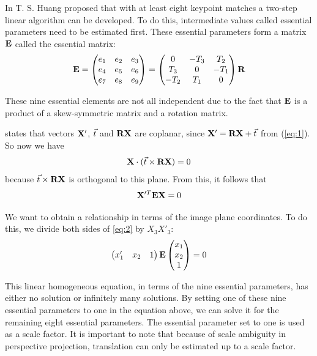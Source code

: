 In \cite{improc} T. S. Huang proposed that with at least eight keypoint matches a two-step linear algorithm can be developed. To do this, intermediate values called essential parameters need to be estimated first. These essential parameters form a matrix $\mathbf{E}$ called the essential matrix:
\begin{equation}\label{eq:essential_def}
    \mathbf{E} = 
    \begin{pmatrix}
        e_1&e_2&e_3 \\
        e_4&e_5&e_6 \\
        e_7&e_8&e_9 
    \end{pmatrix}
    = \begin{pmatrix}
        0&-T_3&T_2 \\
        T_3&0&-T_1 \\
        -T_2&T_1&0
    \end{pmatrix}
     \mathbf{R}
\end{equation}

These nine essential elements are not all independent due to the fact that  $\mathbf{E}$ is a product of a skew-symmetric matrix and a rotation matrix.\bigskip

\cite{tekalp} states that vectors $\mathbf{X}'$, $\vec t$ and $\mathbf{R}\mathbf{X}$ are coplanar, since $\mathbf{X}' = \mathbf{R}\mathbf{X} + \vec t$ from (\ref{eq:1}). So now we have 
\begin{equation}
    \mathbf{X} \cdot (\vec t \times \mathbf{R}\mathbf{X}) = 0
\end{equation}
because $\vec t \times \mathbf{R}\mathbf{X}$ is orthogonal to this plane. From this, it follows that 
\begin{equation} \label{eq:2}
    \mathbf{X}'^T\mathbf{E}\mathbf{X} = 0
\end{equation}

We want to obtain a relationship in terms of the image plane coordinates. To do this, we divide both sides of \ref{eq:2} by $X_3 X'_3$:
\begin{equation} \label{eq:essential}
    \begin{pmatrix}
        x_1'&x_2&1
    \end{pmatrix}
    \mathbf{E}
    \begin{pmatrix}
        x_1 \\
        x_2 \\
        1
    \end{pmatrix}
    = 0
\end{equation}

This linear homogeneous equation, in terms of the nine essential parameters, has either no solution or infinitely many solutions. By setting one of these nine essential parameters to one in the equation above, we can solve it for the remaining eight essential parameters. The essential parameter set to one is used as a scale factor. It is important to note that because of scale ambiguity in perspective projection, translation can only be estimated up to a scale factor.

